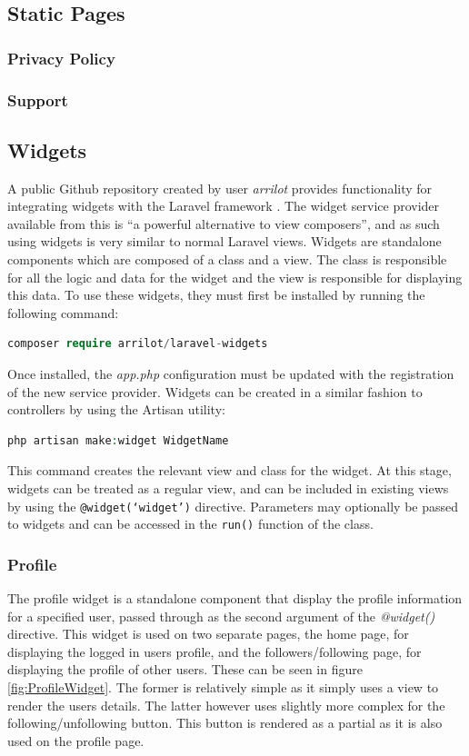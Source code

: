 \subsection{Static Pages}
\subsubsection{Privacy Policy}
\subsubsection{Support}

\subsection{Widgets}
A public Github repository created by user \textit{arrilot} provides functionality for integrating widgets with the Laravel framework \cite{Packagist:LaravelWidgets}. The widget service provider available from this is ``a powerful alternative to view composers'', and as such using widgets is very similar to normal Laravel views. Widgets are standalone components which are composed of a class and a view. The class is responsible for all the logic and data for the widget and the view is responsible for displaying this data. To use these widgets, they must first be installed by running the following command:

\begin{lstlisting}[language=php]
 composer require arrilot/laravel-widgets
\end{lstlisting}

Once installed, the \textit{app.php} configuration must be updated with the registration of the new service provider. Widgets can be created in a similar fashion to controllers by using the Artisan utility:

\begin{lstlisting}[language=php]
 php artisan make:widget WidgetName
\end{lstlisting}

This command creates the relevant view and class for the widget. At this stage, widgets can be treated as a regular view, and can be included in existing views by using the \texttt{@widget(`widget')} directive. Parameters may optionally be passed to widgets and can be accessed in the \texttt{run()} function of the class.

\subsubsection{Profile}
The profile widget is a standalone component that display the profile information for a specified user, passed through as the second argument of the \textit{@widget()} directive. This widget is used on two separate pages, the home page, for displaying the logged in users profile, and the followers/following page, for displaying the profile of other users. These can be seen in figure \ref{fig:ProfileWidget}. The former is relatively simple as it simply uses a view to render the users details. The latter however uses slightly more complex for the following/unfollowing button. This button is rendered as a partial as it is also used on the profile page.

